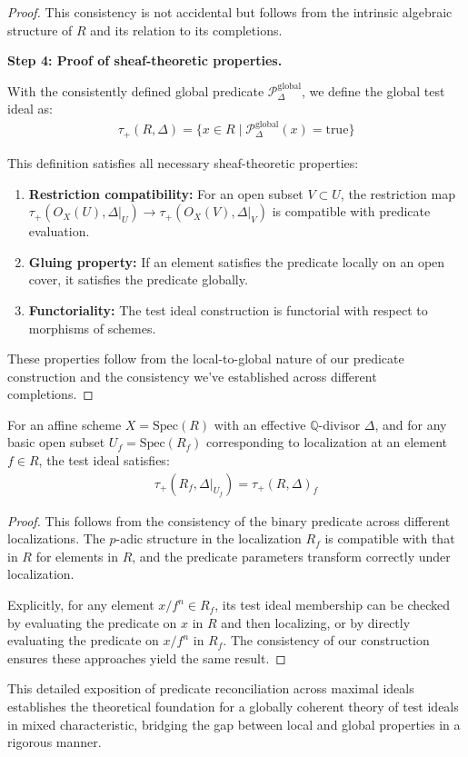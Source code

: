 \begin{proof}
This consistency is not accidental but follows from the intrinsic algebraic structure of $R$ and its relation to its completions.

\textbf{Step 4: Proof of sheaf-theoretic properties.}

With the consistently defined global predicate $\mathcal{P}_{\Delta}^{\text{global}}$, we define the global test ideal as:
\begin{align*}
\tau_+(R, \Delta) = \{x \in R \mid \mathcal{P}_{\Delta}^{\text{global}}(x) = \text{true}\}
\end{align*}

This definition satisfies all necessary sheaf-theoretic properties:

\begin{enumerate}
    \item \textbf{Restriction compatibility:} For an open subset $V \subset U$, the restriction map $\tau_+(O_X(U), \Delta|_U) \to \tau_+(O_X(V), \Delta|_V)$ is compatible with predicate evaluation.
    
    \item \textbf{Gluing property:} If an element satisfies the predicate locally on an open cover, it satisfies the predicate globally.
    
    \item \textbf{Functoriality:} The test ideal construction is functorial with respect to morphisms of schemes.
\end{enumerate}

These properties follow from the local-to-global nature of our predicate construction and the consistency we've established across different completions.
\end{proof}

\begin{corollary}\label{cor:affine-localization}
For an affine scheme $X = \text{Spec}(R)$ with an effective $\mathbb{Q}$-divisor $\Delta$, and for any basic open subset $U_f = \text{Spec}(R_f)$ corresponding to localization at an element $f \in R$, the test ideal satisfies:
\begin{align*}
\tau_+(R_f, \Delta|_{U_f}) = \tau_+(R, \Delta)_f
\end{align*}
\end{corollary}

\begin{proof}
This follows from the consistency of the binary predicate across different localizations. The $p$-adic structure in the localization $R_f$ is compatible with that in $R$ for elements in $R$, and the predicate parameters transform correctly under localization.

Explicitly, for any element $x/f^n \in R_f$, its test ideal membership can be checked by evaluating the predicate on $x$ in $R$ and then localizing, or by directly evaluating the predicate on $x/f^n$ in $R_f$. The consistency of our construction ensures these approaches yield the same result.
\end{proof}

This detailed exposition of predicate reconciliation across maximal ideals establishes the theoretical foundation for a globally coherent theory of test ideals in mixed characteristic, bridging the gap between local and global properties in a rigorous manner. 